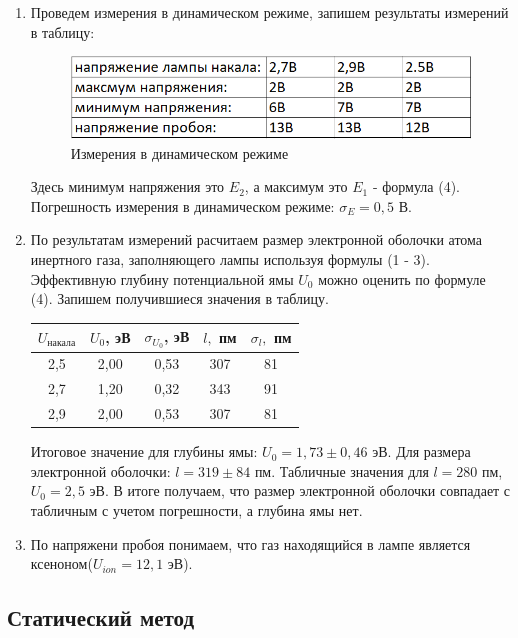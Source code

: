 \documentclass[a4paper,12pt]{article} %
\begin{document}
\begin{enumerate}
\item Проведем измерения в динамическом режиме, запишем результаты измерений в таблицу:

\begin{figure}[h!]
\centering
\includegraphics[width=0.7\linewidth]{images/table_1.png}
\caption{Измерения в динамическом режиме}
\label{table_1}
\end{figure}

Здесь минимум напряжения это $E_2$, а максимум это $E_1$ - формула (4). Погрешность измерения в динамическом режиме: $\sigma_E = 0,5$ В.

\item По результатам измерений расчитаем размер электронной оболочки атома инертного газа, заполняющего лампы используя формулы (1 - 3). Эффективную глубину потенциальной ямы $U_0$ можно оценить по формуле (4). Запишем получившиеся значения в таблицу.

\begin{center}
\begin{tabular}{|c|c|c|c|c|}
\hline 
$U_{\text{накала}}$ & $U_0$, эВ & $\sigma_{U_0}$, эВ  & $l,$ пм & $\sigma_l,$ пм\\ 
\hline 
2,5 & 2,00 & 0,53 & 307 & 81 \\ 
\hline 
2,7 & 1,20 & 0,32 & 343 & 91\\ 
\hline 
2,9 & 2,00 & 0,53 & 307 & 81\\ 
\hline 
\end{tabular} 
\end{center}

Итоговое значение для глубины ямы: $U_0 = 1,73 \pm 0,46$ эВ. Для размера электронной оболочки: $l = 319 \pm 84$ пм. Табличные значения для $l = 280$ пм, $U_0 = 2,5$ эВ. В итоге получаем, что размер электронной оболочки совпадает с табличным с учетом погрешности, а глубина ямы нет.

\item По напряжени пробоя понимаем, что газ находящийся в лампе является ксеноном($U_{ion} = 12,1$ эВ).

\end{enumerate}

\subsection{Статический метод}
\end{document}
